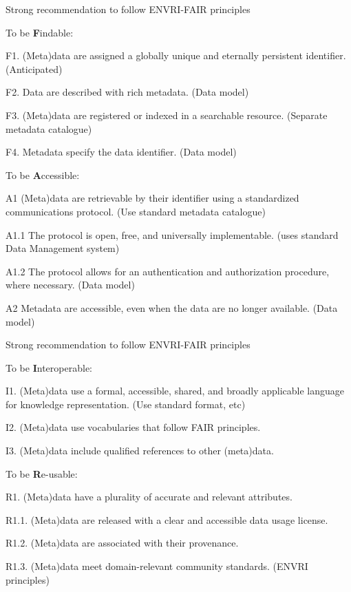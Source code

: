 \begin{frame}[fragile,t]
  \vspace{\mytopbit}
  {Strong recommendation to follow ENVRI-FAIR principles}
\bitm
  \item {To be {\bf F}indable:}
  \bitm
    \item F1. (Meta)data are assigned a globally unique and eternally persistent identifier. {\colblue (Anticipated)}
    \item F2. Data are described with rich metadata. {\colblue (\ED Data model)}
    \item F3. (Meta)data are registered or indexed in a searchable resource. {\colblue (Separate \ED metadata catalogue)}
    \item F4. Metadata specify the data identifier. {\colblue (\ED Data model)}
  \eitm
  \item {To be {\bf A}ccessible:}
  \bitm
    \item A1 (Meta)data are retrievable by their identifier using a standardized communications protocol. {\colblue (Use standard metadata catalogue)}
    \item A1.1 The protocol is open, free, and universally implementable. {\colblue (\ED uses standard Data Management system)}
    \item A1.2 The protocol allows for an authentication and authorization procedure, where necessary. {\colblue (\ED Data model)}
    \item A2 Metadata are accessible, even when the data are no longer available. {\colblue (\ED Data model)}
  \eitm
\eitm
\end{frame}

\begin{frame}[fragile,t]
  \vspace{\mytopbit}
  {Strong recommendation to follow ENVRI-FAIR principles}
\bitm
\item {To be {\bf I}nteroperable:}
  \bitm
    \item I1. (Meta)data use a formal, accessible, shared, and broadly applicable language for knowledge representation. {\colblue (Use standard format, \HDF etc)}
    \item I2. (Meta)data use vocabularies that follow FAIR principles.
    \item I3. (Meta)data include qualified references to other (meta)data.
  \eitm
\item {To be {\bf R}e-usable:}
  \bitm
    \item R1. (Meta)data have a plurality of accurate and relevant attributes.
    \item R1.1. (Meta)data are released with a clear and accessible data usage license.
    \item R1.2. (Meta)data are associated with their provenance.
    \item R1.3. (Meta)data meet domain-relevant community standards. {\colblue (ENVRI principles)}
  \eitm
\eitm
\end{frame}
